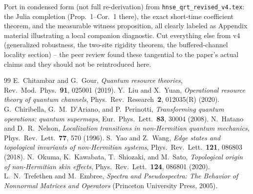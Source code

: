 \begin{todo}
Port in condensed form (not full re-derivation) from
\texttt{hnse\_qrt\_revised\_v4.tex}: the Julia completion
(Prop.~1--Cor.~1 there), the exact short-time coefficient theorem,
and the measurable witness proposition, all clearly labeled as
Appendix material illustrating a local companion diagnostic. Cut
everything else from v4 (generalized robustness, the two-site
rigidity theorem, the buffered-channel locality section) -- the
peer review found these tangential to the paper's actual claims and
they should not be reintroduced here.
\end{todo}

\begin{acknowledgments}
\end{acknowledgments}

\begin{thebibliography}{99}
E.~Chitambar and G.~Gour,
\textit{Quantum resource theories},
Rev.~Mod.~Phys.~\textbf{91}, 025001 (2019).
Y.~Liu and X.~Yuan,
\textit{Operational resource theory of quantum channels},
Phys.~Rev.~Research~\textbf{2}, 012035(R) (2020).
G.~Chiribella, G.~M.~D'Ariano, and P.~Perinotti,
\textit{Transforming quantum operations: quantum supermaps},
Eur.~Phys.~Lett.~\textbf{83}, 30004 (2008).
N.~Hatano and D.~R.~Nelson,
\textit{Localization transitions in non-Hermitian quantum mechanics},
Phys.~Rev.~Lett.~\textbf{77}, 570 (1996).
S.~Yao and Z.~Wang,
\textit{Edge states and topological invariants of non-Hermitian systems},
Phys.~Rev.~Lett.~\textbf{121}, 086803 (2018).
N.~Okuma, K.~Kawabata, T.~Shiozaki, and M.~Sato,
\textit{Topological origin of non-Hermitian skin effects},
Phys.~Rev.~Lett.~\textbf{124}, 086801 (2020).
L.~N.~Trefethen and M.~Embree,
\textit{Spectra and Pseudospectra: The Behavior of Nonnormal
Matrices and Operators} (Princeton University Press, 2005).
\end{thebibliography}

